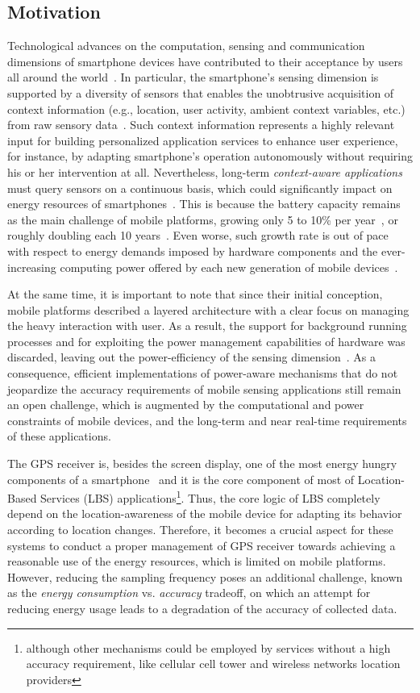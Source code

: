 \documentclass[ENG,PhD]{cinvestav}
\begin{document}
\subsection{Motivation}
Technological advances on the computation, sensing and communication dimensions of smartphone devices have contributed to their acceptance by users all around the world~\cite{Campbell2012}.
In particular, the smartphone's sensing dimension is supported by a diversity of sensors that enables the unobtrusive acquisition of context information (e.g., location, user activity, ambient context variables, etc.) from raw sensory data~\cite{Lane2010}.
Such context information represents a highly relevant input for building personalized application services to enhance user experience, for instance, by adapting smartphone's operation autonomously without requiring his or her intervention at all.
Nevertheless, long-term \emph{context-aware applications} must query sensors on a continuous basis, which could significantly impact on energy resources of smartphones~\cite{Macias2013}.
This is because the battery capacity remains as the main challenge of mobile platforms, growing only 5 to 10\% per year~\cite{Ma2012,Evarts2015}, or roughly doubling each 10 years~\cite{Tom2015}.
Even worse, such growth rate is out of pace with respect to energy demands imposed by hardware components and the ever-increasing computing power offered by each new generation of mobile devices~\cite{Yurur2015}.

At the same time, it is important to note that since their initial conception, mobile platforms described a layered architecture with a clear focus on managing the heavy interaction with user.
As a result, the support for background running processes and for exploiting the power management capabilities of hardware was discarded, leaving out the power-efficiency of the sensing dimension~\cite{Priyantha2011}.
As a consequence, efficient implementations of power-aware mechanisms that do not jeopardize the accuracy requirements of mobile sensing applications still remain an open challenge, which is augmented by the computational and power constraints of mobile devices, and the long-term and near real-time requirements of these applications.

The GPS receiver is, besides the screen display, one of the most energy hungry components of a smartphone~\cite{Perez-Torres2016} and it is the core component of most of Location-Based Services (LBS) applications\footnote{although other mechanisms could be employed by services without a high accuracy requirement, like cellular cell tower and wireless networks location providers}.
Thus, the core logic of LBS completely depend on the location-awareness of the mobile device for adapting its behavior according to location changes.
Therefore, it becomes a crucial aspect for these systems to conduct a proper management of GPS receiver towards achieving a reasonable use of the energy resources, which is limited on mobile platforms.
However, reducing the sampling frequency poses an additional challenge, known as the \emph{energy consumption} vs. \emph{accuracy} tradeoff, on which an attempt for reducing energy usage leads to a degradation of the accuracy of collected data.
\end{document}
